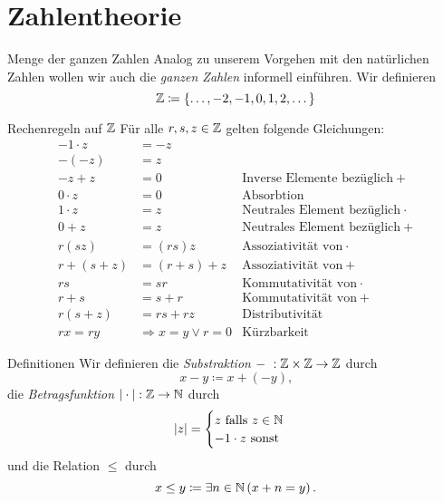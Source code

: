 \section{Zahlentheorie}\label{sec:zahlentheorie}

\begin{definition}{Menge der ganzen Zahlen}
    Analog zu unserem Vorgehen mit den natürlichen Zahlen wollen wir auch die \emph{ganzen Zahlen} informell einführen.
    Wir definieren \[\mathbb{Z} \coloneqq \{\dots,-2,-1,0,1,2,\dots\}\]
\end{definition}

\begin{definition}{Rechenregeln auf $\mathbb{Z}$}
    Für alle $r,s,z \in \mathbb{Z}$ gelten folgende Gleichungen:
    \begin{align*}
        -1 \cdot z &= -z \\
        -(-z) &= z \\
        -z + z &= 0 & \text{Inverse Elemente bezüglich} \  +\\
        0 \cdot z &= 0 & \text{Absorbtion}\\
        1 \cdot z &= z &\text{Neutrales Element bezüglich} \ \cdot\\
        0 + z &= z &\text{Neutrales Element bezüglich} \ +\\
        r(sz) &= (rs)z &\text{Assoziativität von} \ \cdot\\
        r + (s + z) &= (r + s) + z &\text{Assoziativität von} \ +\\
        rs &= sr &\text{Kommutativität von} \ \cdot\\
        r + s &= s + r &\text{Kommutativität von} \ +\\
        r(s + z) &= rs + rz &\text{Distributivität}\\
        rx = ry &\Rightarrow x = y \lor r = 0 &\text{Kürzbarkeit}
    \end{align*}
\end{definition}

\begin{definition}{Definitionen}
    Wir definieren die \emph{Substraktion} $-\ : \mathbb{Z} \times \mathbb{Z} \rightarrow \mathbb{Z}$ durch \[x - y \coloneqq x + (-y)\text{,}\]
    die \emph{Betragsfunktion} $| \cdot | : \mathbb{Z} \rightarrow \mathbb{N}$ durch \[ |z| =
    \begin{cases}
        z$ falls $z \in \N \\ -1 \cdot z$ sonst$
    \end{cases}\]
    und die Relation $\leq$ durch \[x \leq y \coloneqq \exists n \in \mathbb{N} \left(x + n = y\right)\text{.}\]
\end{definition}

